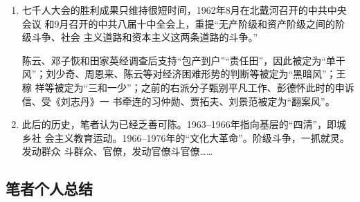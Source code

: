 \begin{enumerate}
\item 七千人大会的胜利成果只维持很短时间，1962年8月在北戴河召开的中共中央会议
  和9月召开的中共八届十中全会上，重提“无产阶级和资产阶级之间的阶级斗争、社会
  主义道路和资本主义这两条道路的斗争。”

  陈云、邓子恢和田家英经调查后支持“包产到户”“责任田”，因此被定为“单干
  风”；刘少奇、周恩来、陈云等对经济困难形势的判断等被定为“黑暗风”；王稼
  祥等被定为“三和一少”；之前的右派分子甄别平凡工作、彭德怀此时的申诉信、受《刘志丹》一
  书牵连的习仲勋、贾拓夫、刘景范被定为“翻案风”。

\item 此后的历史，笔者认为已经乏善可陈。1963--1966年指向基层的“四清”，即城乡社
  会主义教育运动。1966--1976年的“文化大革命”。阶级斗争，一抓就灵。发动群众
  斗群众、官僚，发动官僚斗官僚……
\end{enumerate}

\subsection{笔者个人总结}

